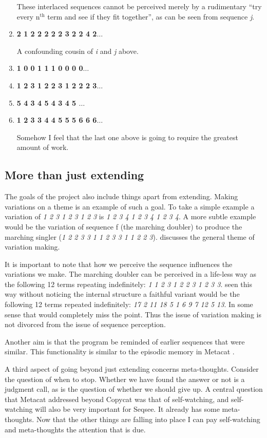 \documentclass[letterpaper]{article}
\begin{document}
\begin{enumerate}
These interlaced sequences cannot be perceived merely by a rudimentary ``try every n$^\mathrm{th}$ term and see if they fit together'', as can be seen from sequence \emph{j}.

\item \textbf{ 2 1 2 2 2 2 2 3 2 2 4 2$\ldots$}

A confounding cousin of \emph{i} and \emph{j} above.

\item \textbf{ 1 0 0 1 1 1 0 0 0 0$\ldots$}
\item \textbf{ 1 2 3 1 2 2 3 1 2 2 2 3$\ldots$}
\item \textbf{ 5 4 3 4 5 4 3 4 5 $\ldots$}
\item \textbf{ 1 2 3 3 4 4 5 5 5 6 6 6$\ldots$}

Somehow I feel that the last one above is going to require the greatest amount of work.
\end{enumerate}

\subsection{More than just extending}
\label{sec:more}
The goals of the project also include things apart from extending.  Making variations on a theme is an example of such a goal.  To take a simple example a variation of \emph{1 2 3 1 2 3 1 2 3} is \emph{1 2 3 4 1 2 3 4 1 2 3 4}.  A more subtle example would be the variation of  sequence f (the marching doubler) to produce the marching singler (\emph{1 2 2 3 3 1 1 2 3 3 1 1 2 2 3}).  discusses the general theme of variation making.

It is important to note that how we perceive the sequence influences the variations we make.  The marching doubler can be perceived in a life-less way as the following 12 terms repeating indefinitely: \emph{1 1 2 3 1 2 2 3 1 2 3 3}.  seen this way without noticing the internal structure a faithful variant would be the following 12 terms repeated indefinitely: \emph{17 2 11 18 5 1 6 9 7 12 5 13}. In some sense that would completely miss the point. Thus the issue of variation making is not divorced from the issue of sequence perception.

Another aim is that the program be reminded of earlier sequences that were similar.  This functionality is similar to the episodic memory in Metacat \cite{Marshall}.

A third aspect of going beyond just extending concerns meta-thoughts.  Consider the question of when to stop.  Whether we have found the answer or not is a judgment call, as is the question of whether we should give up. A central question that Metacat addressed beyond Copycat was that of self-watching, and self-watching will also be very important for Seqsee. It already has some meta-thoughts. Now that the other things are falling into place I can pay self-watching and meta-thoughts the attention that is due. 
\end{document}
